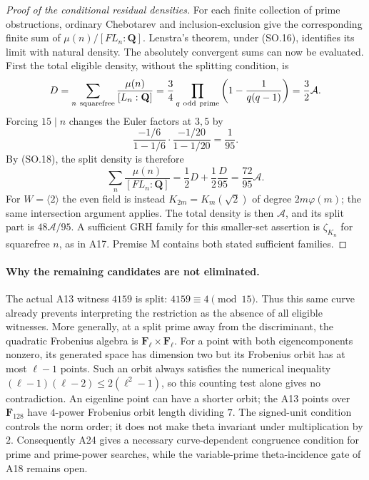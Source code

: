 \begin{proof}[Proof of the conditional residual densities]
For each finite collection of prime obstructions, ordinary
Chebotarev and inclusion-exclusion give the corresponding
finite sum of $\mu(n)/[FL_n:\mathbf Q]$.  Lenstra's theorem,
under (SO.16), identifies its limit with natural density.
The absolutely convergent sums can now be evaluated.  First
the total eligible density, without the splitting condition, is
\[
 D=\sum_{n\ {\rm squarefree}}\frac{\mu(n)}{[L_n:\mathbf Q]}
   =\frac34\prod_{q\ {\rm odd\ prime}}
                     \left(1-\frac1{q(q-1)}\right)
   =\frac32\mathcal A.
\]
Forcing $15\mid n$ changes the Euler factors at $3,5$ by
\[
 \frac{-1/6}{1-1/6}\cdot\frac{-1/20}{1-1/20}
                            =\frac1{95}.
\]
By (SO.18), the split density is therefore
\[
 \sum_n\frac{\mu(n)}{[FL_n:\mathbf Q]}
       =\frac12D+\frac12\frac{D}{95}
       =\frac{72}{95}\mathcal A.
\]
For $W=\langle2\rangle$ the even field is instead
$K_{2m}=K_m(\sqrt2)$ of degree $2m\varphi(m)$; the same
intersection argument applies.  The total density is then
$\mathcal A$, and its split part is $48\mathcal A/95$.
A sufficient GRH family for this smaller-set assertion is
$\zeta_{K_n}$ for squarefree $n$, as in A17.  Premise M
contains both stated sufficient families.
\end{proof}

\paragraph{Why the remaining candidates are not eliminated.}
The actual A13 witness $4159$ is split: $4159\equiv4\pmod{15}$.
Thus this same curve already prevents interpreting the
restriction as the absence of all eligible witnesses.
More generally, at a split prime away from the discriminant,
the quadratic Frobenius algebra is
$\mathbf F_\ell\times\mathbf F_\ell$.  For a point with
both eigencomponents nonzero, its generated space has dimension
two but its Frobenius orbit has at most $\ell-1$ points.
Such an orbit always satisfies the numerical inequality
$(\ell-1)(\ell-2)\le2(\ell^2-1)$, so this counting test
alone gives no contradiction.  An eigenline point can have a
shorter orbit; the A13 points over $\mathbf F_{128}$ have
$4$-power Frobenius orbit length dividing $7$.
The signed-unit condition controls the norm order; it does not
make theta invariant under multiplication by $2$.
Consequently A24 gives a necessary curve-dependent congruence
condition for prime and prime-power searches, while the
variable-prime theta-incidence gate of A18 remains open.

